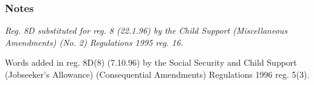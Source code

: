 \documentclass[a4paper]{article}
\newcommand\amendment[1]{\subsubsection*{Notes}{\itshape\frenchspacing\footnotesize #1 \par}}
\begin{document}
\amendment{
Reg. 8D substituted for reg. 8 (22.1.96) by the Child Support (Miscellaneous Amendments) (No. 2) Regulations 1995 reg. 16.

Words added in reg. 8D(8) (7.10.96) by the Social Security and Child Support (Jobseeker's Allowance) (Consequential Amendments) Regulations 1996 reg. 5(3).
}

%
%
%
%
%
%
%
%
\end{document}
